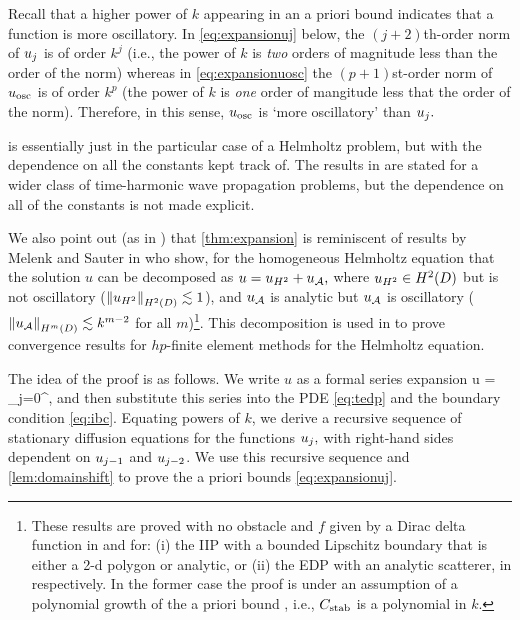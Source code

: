 \label{rem:osc}
Recall that a higher power of $k$ appearing in an a priori bound indicates that a function is more oscillatory. In \cref{eq:expansionuj} below, the $(j+2)$th-order norm of $u_{j}$ is of order $k^j$ (i.e., the power of $k$ is \emph{two} orders of magnitude less than the order of the norm) whereas in \cref{eq:expansionuosc} the $(p+1)$st-order norm of $u_{\mathrm{osc}}$ is of order $k^p$ (the power of $k$ is \emph{one} order of mangitude less that the order of the norm). Therefore, in this sense, $u_{\mathrm{osc}}$ is `more oscillatory' than $u_{j}.$
\ere

 is essentially just \cite[Theorem 1]{ChNi:19} in the particular case of a Helmholtz problem, but with the dependence on all the constants kept track of. The results in \cite{ChNi:19} are stated for a wider class of time-harmonic wave propagation problems, but the dependence on all of the constants is not made explicit.

We also point out (as in \cite[Section 7]{ChNi:19}) that \cref{thm:expansion} is reminiscent of results by Melenk and Sauter in \cite{MeSa:10,MeSa:11}who show, for the homogeneous Helmholtz equation that the solution $u$ can be decomposed as $u = u_{H^{2}} + u_{\mathcal A},$ where $\uHt \in \HtD$ but is not oscillatory ($\NHtD{\uHt} \lesssim 1$), and $u_{\mathcal A}$ is analytic but $u_{\mathcal A}$ is oscillatory ($\NHmD{\uA} \lesssim k^{m-2}$ for all $m$)\footnote{These results are proved with no obstacle and $f$ given by a Dirac delta function in \cite[Lemma 3.5]{MeSa:10} and for: (i) the IIP with a bounded Lipschitz boundary that is either a 2-d polygon or analytic, or (ii) the EDP with an analytic scatterer, in \cite[Theorems 4.10, 4.20]{MeSa:11} respectively. In the former case the proof is under an assumption of a polynomial growth of the a priori bound \cite[Assumption 4.8]{MeSa:11}, i.e., $C_{\mathrm{stab}}$ is a polynomial in $k$.}. This decomposition is used in \cite{MeSa:10,MeSa:11} to prove convergence results for $hp$-finite element methods for the Helmholtz equation. %

The idea of the proof is as follows. We write $u$ as a formal series expansion
\beq\label{eq:formalseries}
u = \sum_{j=0}^\infty \usj,
\eeq
and then substitute this series into the PDE \cref{eq:tedp} and the boundary condition \eqref{eq:ibc}. Equating powers of $k$, we derive a recursive sequence of stationary diffusion equations for the functions $u_{j},$ with right-hand sides dependent on $u_{j-1}$ and $u_{j-2}$. We use this recursive sequence and \cref{lem:domainshift} to prove the a priori bounds \cref{eq:expansionuj}.

